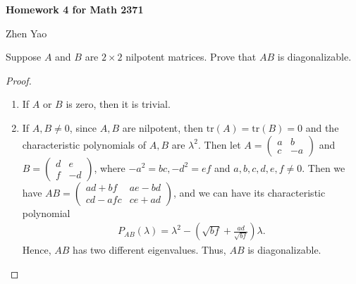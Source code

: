 \documentclass[12pt]{article}
\begin{document}
\centerline{\bf Homework 4 for Math 2371}
\centerline{Zhen Yao}

\medskip

Suppose $A$ and $B$ are $2 \times 2$ nilpotent matrices. Prove that $AB$ is diagonalizable.
\begin{proof}
~\begin{enumerate}[label=(\arabic*)]
    \item If $A$ or $B$ is zero, then it is trivial.
    \item If $A,B \neq 0$, since $A, B$ are nilpotent, then $\text{tr}(A) = \text{tr}(B) = 0$ and the characteristic polynomials of $A, B$ are $\lambda^2$. Then let $A = \begin{pmatrix} 
        a & b  \\
        c & -a 
    \end{pmatrix}$ and $B = \begin{pmatrix} 
        d & e  \\
        f & -d 
    \end{pmatrix}$, where $-a^2 = bc, -d^2 = ef$ and $a,b,c,d,e,f \neq 0$. Then we have $AB = \begin{pmatrix} 
        ad+bf & ae-bd  \\
        cd-afc & ce+ad 
    \end{pmatrix}$, and we can have its characteristic polynomial
    \begin{align*}
        P_{AB}(\lambda) = \lambda^2  - \left(\sqrt{bf} + \frac{ad}{\sqrt{bf}} \right)\lambda.
    \end{align*}
    Hence, $AB$ has two different eigenvalues. Thus, $AB$ is diagonalizable.
\end{enumerate}
\end{proof}

\medskip
\end{document}
